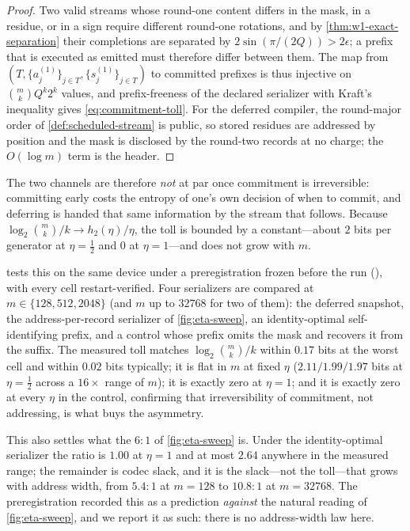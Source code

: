 \documentclass[aps,prx,reprint,floatfix,superscriptaddress]{revtex4-2}
\begin{document}
\begin{proof}
Two valid streams whose round-one content differs in the mask, in a
residue, or in a sign require different round-one rotations, and by
\cref{thm:w1-exact-separation} their completions are separated by
$2\sin(\pi/(2Q))>2\epsilon$; a prefix that is executed as emitted must
therefore differ between them.  The map from
$(T,\{a_j^{(1)}\}_{j\in T},\{s_j^{(1)}\}_{j\in T})$ to committed
prefixes is thus injective on $\binom{m}{k}Q^k2^k$ values, and
prefix-freeness of the declared serializer with Kraft's inequality
gives \eqref{eq:commitment-toll}.  For the deferred compiler, the
round-major order of \cref{def:scheduled-stream} is public, so stored
residues are addressed by position and the mask is disclosed by the
round-two records at no charge; the $O(\log m)$ term is the header.
\end{proof}

The two channels are therefore \emph{not} at par once commitment is
irreversible: committing early costs the entropy of one's own decision
of when to commit, and deferring is handed that same information by the
stream that follows.  Because $\log_2\binom{m}{k}/k\to h_2(\eta)/\eta$,
the toll is bounded by a constant---about $2$ bits per generator at
$\eta=\tfrac12$ and $0$ at $\eta=1$---and does not grow with $m$.

 tests this on the same device under a
preregistration frozen before the run
(), with every cell
restart-verified.  Four serializers are compared at
$m\in\{128,512,2048\}$ (and $m$ up to $32768$ for two of them): the
deferred snapshot, the address-per-record serializer of
\cref{fig:eta-sweep}, an identity-optimal self-identifying prefix, and
a control whose prefix omits the mask and recovers it from the suffix.
The measured toll matches $\log_2\binom{m}{k}/k$ within $0.17$ bits at
the worst cell and within $0.02$ bits typically; it is flat in $m$ at
fixed $\eta$ ($2.11/1.99/1.97$ bits at $\eta=\tfrac12$ across a
$16\times$ range of $m$); it is exactly zero at $\eta=1$; and it is
exactly zero at every $\eta$ in the control, confirming that
irreversibility of commitment, not addressing, is what buys the
asymmetry.

This also settles what the $6{:}1$ of \cref{fig:eta-sweep} is.  Under
the identity-optimal serializer the ratio is $1.00$ at $\eta=1$ and at
most $2.64$ anywhere in the measured range; the remainder is codec
slack, and it is the slack---not the toll---that grows with address
width, from $5.4{:}1$ at $m=128$ to $10.8{:}1$ at $m=32768$.  The
preregistration recorded this as a prediction \emph{against} the
natural reading of \cref{fig:eta-sweep}, and we report it as such: there
is no address-width law here.
\end{document}
